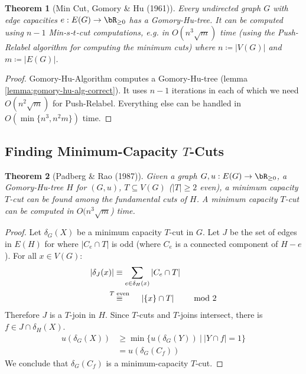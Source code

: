 \documentclass[11pt, a4paper]{article}
\newcommand{\stackalign}[2]{\stackrel{\mathclap{#1}}{#2}}
\newcommand{\abs}[1]{\left\lvert#1\right\rvert}
\newcommand{\set}[1]{\{#1\}}
\newtheorem{theorem}{Theorem}[section]
\theoremstyle{remark}
\theoremstyle{definition}
\begin{document}
\begin{theorem}[Min Cut, Gomory \& Hu (1961)]
	Every undirected graph $G$ with edge capacities $e: E(G)\to\bR_{\geq0}$
	has a Gomory-Hu-tree. It can be computed using $n-1$ Min-$s$-$t$-cut
	computations, e.g. in $O(n^3\sqrt{m})$ time (using the Push-Relabel
	algorithm for computing the minimum cuts) where $n\coloneqq \abs{V(G)}$
	and $m\coloneqq \abs{E(G)}$.
\end{theorem}
\begin{proof}
	Gomory-Hu-Algorithm computes a Gomory-Hu-tree  (lemma \ref{lemma:gomory-hu-alg-correct}).
	It uses $n-1$ iterations in each of which we need $O(n^2\sqrt{m})$ for
	Push-Relabel. Everything else can be handled in $O(\min\set{n^3,n^2m})$ time.
\end{proof}

\subsection{Finding Minimum-Capacity \texorpdfstring{$T$}{T}-Cuts}

\begin{theorem}[Padberg \& Rao (1987)]
	Given a graph $G, u: E(G)\to\bR_{\geq0}$, a Gomory-Hu-tree $H$ for $(G,u)$,
	$T\subseteq V(G)$ ($\abs{T}\geq2$ even), a minimum capacity $T$-cut can
	be found among the fundamental cuts of $H$. A minimum capacity $T$-cut
	can be computed in $O(n^3\sqrt{m}$) time.
\end{theorem}
\begin{proof}
	Let $\delta_G(X)$ be a minimum capacity $T$-cut in $G$. Let $J$ be the set
	of edges in $E(H)$ for where $\abs{C_e\cap T}$ is odd (where $C_e$ is a
	connected component of $H-e$). For all $x\in V(G)$:
	\begin{align*}
		\abs{\delta_J(x)} & \equiv \sum_{e\in \delta_H(x)}\abs{C_e\cap T}                         \\
		                  & \stackalign{T\text{ even}}{\equiv}\qquad \abs{\set{x}\cap T} & \mod 2
	\end{align*}
	Therefore $J$ is a $T$-join in $H$. Since $T$-cuts and $T$-joins intersect,
	there is $f\in J\cap \delta_H(X)$.
	\begin{align*}
		u(\delta_G(X)) & \geq \min\set{u(\delta_G(Y))\ |\ \abs{Y\cap f}=1} \\
		               & =u(\delta_G(C_f))
	\end{align*}
	We conclude that $\delta_G(C_f)$ is a minimum-capacity $T$-cut.
\end{proof}
\end{document}

